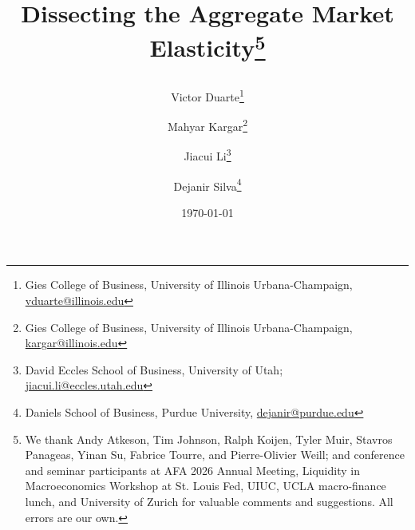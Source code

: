 \documentclass[12pt,english]{article}
\title{\textbf{Dissecting the Aggregate Market Elasticity\thanks{We thank Andy Atkeson, Tim Johnson, Ralph Koijen, Tyler Muir, Stavros Panageas, Yinan Su, Fabrice Tourre, and Pierre-Olivier Weill; and conference and seminar participants at AFA 2026 Annual Meeting, Liquidity in Macroeconomics Workshop at St. Louis Fed, UIUC, UCLA macro-finance lunch, and University of Zurich for valuable comments and suggestions. All errors are our own.}}
\author{ 
Victor Duarte\thanks{Gies College of Business, University of Illinois Urbana-Champaign, \href{mailto:vduarte@illinois.edu}{vduarte@illinois.edu}}\and 
Mahyar Kargar\thanks{Gies College of Business, University of Illinois Urbana-Champaign, \href{mailto:kargar@illinois.edu}{kargar@illinois.edu}}\and Jiacui Li\thanks{David Eccles School of Business, University of Utah; \href{mailto:jiacui.li@eccles.utah.edu}{jiacui.li@eccles.utah.edu}} \and Dejanir Silva\thanks{Daniels School of Business, Purdue University, \href{dejanir@purdue.edu}{dejanir@purdue.edu}}}
}
\date{\today}
\begin{document}
  \sloppy
  \maketitle
  \thispagestyle{empty}
  
  \begin{abstract} 
  \noindent 

\end{abstract}
\end{document}
